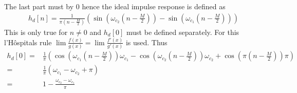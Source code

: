 The last part must by $0$ hence the ideal impulse response is defined as
\begin{align*}
h_d[n]= \frac{1}{\pi \left(n-\frac{M}{2}\right)} \left(\sin\left(\omega_{c_2} \left(n-\frac{M}{2}\right)\right) - \sin\left(\omega_{c_1} \left(n-\frac{M}{2}\right)\right)\right)
\end{align*}
This is only true for $n \neq 0$ and $h_d[0]$ must be defined separately. For this l'Hôspitals rule $\lim \frac{f(x)}{g(x)}=\lim \frac{f'(x)}{g'(x)}$ is used. Thus
\begin{align*}
h_d[0]=& \frac{1}{\pi} \left( \cos\left( \omega_{c_1} \left(n-\frac{M}{2}\right) \right)\omega_{c_1} - \cos\left( \omega_{c_2} \left(n-\frac{M}{2}\right) \right)\omega_{c_2} +  \cos\left(\pi \left( n- \frac{M}{2}\right) \right) \pi \right) \\
=& \frac{1}{\pi}\left( \omega_{c_1} - \omega_{c_2} + \pi \right) \\
=& 1 - \frac{\omega_{c_2}-\omega_{c_1}}{\pi}
\end{align*}
 
 